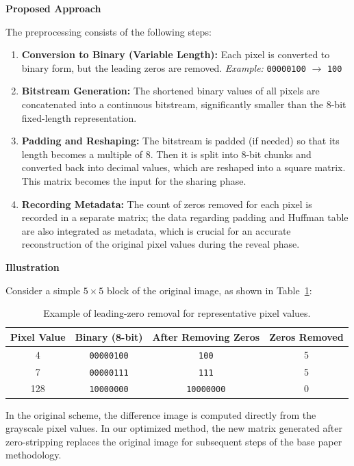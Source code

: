 \textbf{Proposed Approach}
 
The preprocessing consists of the following steps:
\begin{enumerate}
    \item \textbf{Conversion to Binary (Variable Length):} Each pixel is converted to binary form, but the leading zeros are removed. \textit{Example:} \texttt{00000100} $\rightarrow$ \texttt{100}
    \item \textbf{Bitstream Generation:} The shortened binary values of all pixels are concatenated into a continuous bitstream, significantly smaller than the 8-bit fixed-length representation.
    \item \textbf{Padding and Reshaping:} The bitstream is padded (if needed) so that its length becomes a multiple of 8. Then it is split into 8-bit chunks and converted back into decimal values, which are reshaped into a square matrix. This matrix becomes the input for the sharing phase.
    \item \textbf{Recording Metadata:} The count of zeros removed for each pixel is recorded in a separate matrix; the data regarding padding and Huffman table are also integrated as metadata, which is crucial for an accurate reconstruction of the original pixel values during the reveal phase.
\end{enumerate}
 
\textbf{Illustration}
 
Consider a simple $5 \times 5$ block of the original image, as shown in Table~\ref{tab:rlz_illustration}:
 
\begin{table}[t]
\centering
\caption{Example of leading-zero removal for representative pixel values.}
\label{tab:rlz_illustration}
\begin{tabular}{cccc}
\toprule
\textbf{Pixel Value} & \textbf{Binary (8-bit)} & \textbf{After Removing Zeros} & \textbf{Zeros Removed} \\
\midrule
4   & \texttt{00000100} & \texttt{100}      & 5 \\
7   & \texttt{00000111} & \texttt{111}      & 5 \\
128 & \texttt{10000000} & \texttt{10000000} & 0 \\
\bottomrule
\end{tabular}
\end{table}

 
In the original scheme, the difference image is computed directly from the grayscale pixel values. In our optimized method, the new matrix generated after zero-stripping replaces the original image for subsequent steps of the base paper methodology.
 
